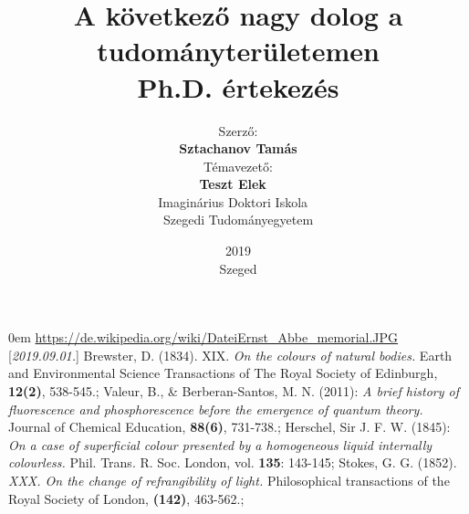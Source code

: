 \documentclass[12pt,a4paper,titlepage,twoside]{article}
\title
{
	\textbf{A következő nagy dolog a tudományterületemen} \\
	\vspace{0.5cm}
	Ph.D. értekezés
}
\author
{
	Szerző:
	\\\textbf{Sztachanov Tamás}	
	\\[2cm]Témavezető:
	\\\textbf{Teszt Elek}
	~\\[4cm]Imaginárius Doktori Iskola
	~\\Szegedi Tudományegyetem
}
\date
{
	2019\\ Szeged
}
\numberwithin{equation}{section}
\numberwithin{figure}{section}
\numberwithin{table}{section}
\begin{document}
\makeatother

\maketitle

\tableofcontents

\begin{spacing}{1.5}
\newpage
%
%
%
%
%
%
%
%
%

\end{spacing}
\begin{spacing}{1}
%
\begin{thebibliography}{999}
\itemsep0em
\href{https://de.wikipedia.org/wiki/Datei:Ernst_Abbe_memorial.JPG}{https://de.wikipedia.org/wiki/Datei\:Ernst\_Abbe\_memorial.JPG}
\mbox{[\textit{2019.09.01.}]}
Brewster, D. (1834). XIX. \textit{On the colours of natural bodies.} Earth and Environmental Science Transactions of The Royal Society of Edinburgh, \textbf{12(2)}, 538-545.;
\mbox{}
Valeur, B., \& Berberan-Santos, M. N. (2011): \textit{A brief history of fluorescence and phosphorescence before the emergence of quantum theory.} Journal of Chemical Education, \textbf{88(6)}, 731-738.;
\mbox{}
Herschel, Sir J. F. W. (1845): \textit{On a case of superficial colour presented by a homogeneous liquid internally colourless.}  Phil. Trans. R. Soc. London, vol. \textbf{135}: 143-145;
\mbox{}
Stokes, G. G. (1852). \textit{XXX. On the change of refrangibility of light.} Philosophical transactions of the Royal Society of London, \textbf{(142)}, 463-562.;
\end{thebibliography}
\end{spacing}
\end{document}
